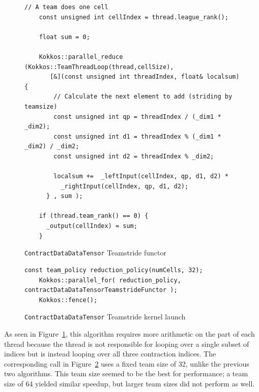 \begin{figure}[ht]
    \begin{lstlisting}[basicstyle=\tiny]
    // A team does one cell
    const unsigned int cellIndex = thread.league_rank();

    float sum = 0;

    Kokkos::parallel_reduce (Kokkos::TeamThreadLoop(thread,cellSize),
       [&](const unsigned int threadIndex, float& localsum) {
        // Calculate the next element to add (striding by teamsize)
        const unsigned int qp = threadIndex / (_dim1 * _dim2);
        const unsigned int d1 = threadIndex % (_dim1 * _dim2) / _dim2;
        const unsigned int d2 = threadIndex % _dim2;
        
        localsum +=  _leftInput(cellIndex, qp, d1, d2) *
          _rightInput(cellIndex, qp, d1, d2);
      } , sum );

    if (thread.team_rank() == 0) {
      _output(cellIndex) = sum;
    }
\end{lstlisting}
\caption{\texttt{ContractDataDataTensor} Teamstride functor
\label{lst:ContractDataDataTensorTeamstrideFunctor}} 
\end{figure}

\begin{figure}[ht]
    \begin{lstlisting}[basicstyle=\tiny]
    const team_policy reduction_policy(numCells, 32);
    Kokkos::parallel_for( reduction_policy, contractDataDataTensorTeamstrideFunctor );
    Kokkos::fence();
    \end{lstlisting}
\caption{\texttt{ContractDataDataTensor} Teamstride kernel launch
\label{lst:ContractDataDataTensorTeamstrideCall}} 
\end{figure}

As seen in Figure~\ref{lst:ContractDataDataTensorTeamstrideFunctor}, this
algorithm requires more arithmetic on the part of each thread because the thread
is not responsible for looping over a single subset of indices but is instead
looping over all three contraction indices. The corresponding call in
Figure~\ref{lst:ContractDataDataTensorTeamstrideCall} uses a fixed team size of
32, unlike the previous two algorithms.  This team size seemed to be the best
for performance; a team size of 64 yielded similar speedup, but larger team
sizes did not perform as well.


